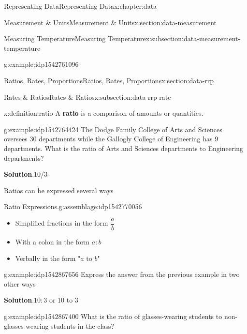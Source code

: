 \documentclass[oneside,10pt,]{book}
\newcommand{\blocktitlefont}{\relax}
\newcommand{\terminology}[1]{\textbf{#1}}
\begin{document}
\begin{chapterptx}{Representing Data}{}{Representing Data}{}{}{x:chapter:data}
\begin{sectionptx}{Measurement \& Units}{}{Measurement \& Units}{}{}{x:section:data-measurement}
\begin{subsectionptx}{Measuring Temperature}{}{Measuring Temperature}{}{}{x:subsection:data-measurement-temperature}
\begin{example}{}{g:example:idp1542761096}
\end{example}
\end{subsectionptx}
\end{sectionptx}
%
%
\typeout{************************************************}
\typeout{************************************************}
%
\begin{sectionptx}{Ratios, Rates, Proportions}{}{Ratios, Rates, Proportions}{}{}{x:section:data-rrp}
%
%
\typeout{************************************************}
\typeout{************************************************}
%
\begin{subsectionptx}{Rates \& Ratios}{}{Rates \& Ratios}{}{}{x:subsection:data-rrp-rate}
\begin{definition}{}{x:definition:ratio}%
A \terminology{ratio} is a comparison of amounts or quantities.%
%
\end{definition}
\begin{example}{}{g:example:idp1542764424}%
The Dodge Family College of Arts and Sciences oversees 30 departments while the Gallogly College of Engineering has 9 departments.  What is the ratio of Arts and Sciences departments to Engineering departments?%
\par\smallskip%
\noindent\textbf{\blocktitlefont Solution}.\hypertarget{g:solution:idp1542771208}{}\quad{}10\slash{}3%
\end{example}
Ratios can be expressed several ways%
\begin{assemblage}{Ratio Expressions.}{g:assemblage:idp1542770056}%
%
\begin{itemize}[label=\textbullet]
\item{}Simplified fractions in the form \(\dfrac{a}{b}\)%
\item{}With a colon in the form \(a:b\)%
\item{}Verbally in the form "\(a\) to \(b\)"%
\end{itemize}
%
\end{assemblage}
\begin{example}{}{g:example:idp1542867656}%
Express the answer from the previous example in two other ways%
\par\smallskip%
\noindent\textbf{\blocktitlefont Solution}.\hypertarget{g:solution:idp1542869320}{}\quad{}\(10:3\) or 10 to 3%
\end{example}
\begin{example}{}{g:example:idp1542867400}%
What is the ratio of glasses-wearing students to non-glasses-wearing students in the class?%

\end{example}
\end{subsectionptx}
\end{sectionptx}
\end{chapterptx}
\end{document}
